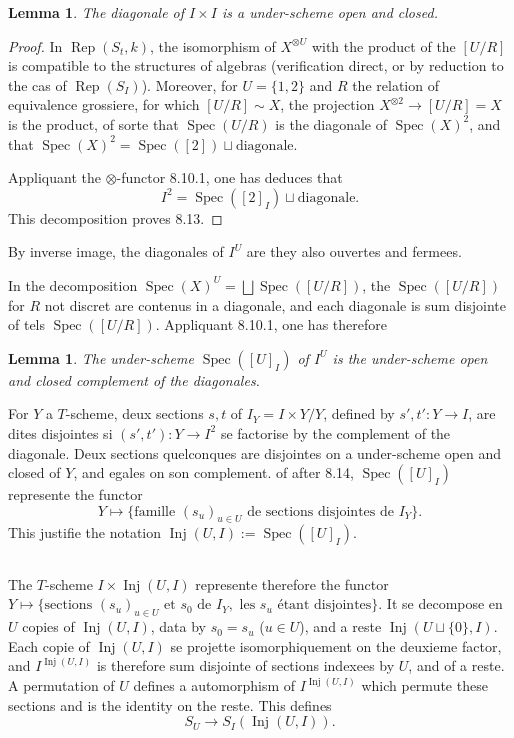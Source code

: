 \documentclass[11pt,a4paper]{article}
\theoremstyle{plain}
\newtheorem{lemma}[theorem]{Lemma}
\theoremstyle{definition}
\DeclareMathOperator{\Spec}{Spec}
\DeclareMathOperator{\Rep}{Rep}
\DeclareMathOperator{\Inj}{Inj}
\begin{document}
\begin{lemma}
The diagonale of $I \times I$ is a under-scheme open and closed.
\end{lemma}

\begin{proof}
In $\Rep(S_t, k)$, the isomorphism of $X^{\otimes U}$ with the product of the $[U/R]$ is compatible to the structures of algebras (verification direct, or by reduction to the cas of $\Rep(S_I)$). Moreover, for $U = \{1, 2\}$ and $R$ the relation of equivalence grossiere, for which $[U/R] \sim X$, the projection $X^{\otimes 2} \to [U/R] = X$ is the product, of sorte that $\Spec(U/R)$ is the diagonale of $\Spec(X)^2$, and that $\Spec(X)^2 = \Spec([2]) \sqcup \text{diagonale}$.

Appliquant the $\otimes$-functor 8.10.1, one has deduces that
\[
I^2 = \Spec([2]_I) \sqcup \text{diagonale}.
\]
This decomposition proves 8.13.
\end{proof}

By inverse image, the diagonales of $I^U$ are they also ouvertes and fermees.

In the decomposition $\Spec(X)^U = \bigsqcup \Spec([U/R])$, the $\Spec([U/R])$ for $R$ not discret are contenus in a diagonale, and each diagonale is sum disjointe of tels $\Spec([U/R])$. Appliquant 8.10.1, one has therefore

\begin{lemma}
The under-scheme $\Spec([U]_I)$ of $I^U$ is the under-scheme open and closed complement of the diagonales.
\end{lemma}

For $Y$ a $T$-scheme, deux sections $s, t$ of $I_Y = I \times Y / Y$, defined by $s', t' : Y \to I$, are dites disjointes si $(s', t') : Y \to I^2$ se factorise by the complement of the diagonale. Deux sections quelconques are disjointes on a under-scheme open and closed of $Y$, and egales on son complement. of after 8.14, $\Spec([U]_I)$ represente the functor
\[
Y \longmapsto \{\text{famille } (s_u)_{u \in U} \text{ de sections disjointes de } I_Y\}.
\]
This justifie the notation $\Inj(U, I) := \Spec([U]_I)$.

\subsection{}
The $T$-scheme $I \times \Inj(U, I)$ represente therefore the functor $Y \mapsto \{\text{sections } (s_u)_{u \in U} \text{ et } s_0 \text{ de } I_Y, \text{ les } s_u \text{ \'etant disjointes}\}$. It se decompose en $U$ copies of $\Inj(U, I)$, data by $s_0 = s_u$ ($u \in U$), and a reste $\Inj(U \sqcup \{0\}, I)$. Each copie of $\Inj(U, I)$ se projette isomorphiquement on the deuxieme factor, and $I^{\Inj(U, I)}$ is therefore sum disjointe of sections indexees by $U$, and of a reste. A permutation of $U$ defines a automorphism of $I^{\Inj(U, I)}$ which permute these sections and is the identity on the reste. This defines
\begin{equation}
S_U \to S_I(\Inj(U, I)). \tag{8.15.1}
\end{equation}
\end{document}
